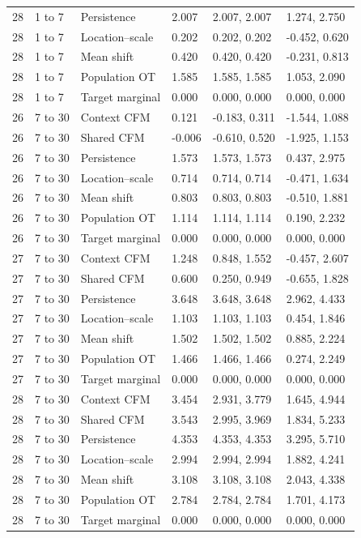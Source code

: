 \documentclass[10pt,a4paper]{article}
\begin{document}
{{\begin{longtable}{@{}p{14mm}p{18mm}p{36mm}p{24mm}p{32mm}p{39mm}@{}}
28 & 1 to 7 & Persistence & 2.007 & 2.007, 2.007 & 1.274, 2.750\\
28 & 1 to 7 & Location--scale & 0.202 & 0.202, 0.202 & -0.452, 0.620\\
28 & 1 to 7 & Mean shift & 0.420 & 0.420, 0.420 & -0.231, 0.813\\
28 & 1 to 7 & Population OT & 1.585 & 1.585, 1.585 & 1.053, 2.090\\
28 & 1 to 7 & Target marginal & 0.000 & 0.000, 0.000 & 0.000, 0.000\\
26 & 7 to 30 & Context CFM & 0.121 & -0.183, 0.311 & -1.544, 1.088\\
26 & 7 to 30 & Shared CFM & -0.006 & -0.610, 0.520 & -1.925, 1.153\\
26 & 7 to 30 & Persistence & 1.573 & 1.573, 1.573 & 0.437, 2.975\\
26 & 7 to 30 & Location--scale & 0.714 & 0.714, 0.714 & -0.471, 1.634\\
26 & 7 to 30 & Mean shift & 0.803 & 0.803, 0.803 & -0.510, 1.881\\
26 & 7 to 30 & Population OT & 1.114 & 1.114, 1.114 & 0.190, 2.232\\
26 & 7 to 30 & Target marginal & 0.000 & 0.000, 0.000 & 0.000, 0.000\\
27 & 7 to 30 & Context CFM & 1.248 & 0.848, 1.552 & -0.457, 2.607\\
27 & 7 to 30 & Shared CFM & 0.600 & 0.250, 0.949 & -0.655, 1.828\\
27 & 7 to 30 & Persistence & 3.648 & 3.648, 3.648 & 2.962, 4.433\\
27 & 7 to 30 & Location--scale & 1.103 & 1.103, 1.103 & 0.454, 1.846\\
27 & 7 to 30 & Mean shift & 1.502 & 1.502, 1.502 & 0.885, 2.224\\
27 & 7 to 30 & Population OT & 1.466 & 1.466, 1.466 & 0.274, 2.249\\
27 & 7 to 30 & Target marginal & 0.000 & 0.000, 0.000 & 0.000, 0.000\\
28 & 7 to 30 & Context CFM & 3.454 & 2.931, 3.779 & 1.645, 4.944\\
28 & 7 to 30 & Shared CFM & 3.543 & 2.995, 3.969 & 1.834, 5.233\\
28 & 7 to 30 & Persistence & 4.353 & 4.353, 4.353 & 3.295, 5.710\\
28 & 7 to 30 & Location--scale & 2.994 & 2.994, 2.994 & 1.882, 4.241\\
28 & 7 to 30 & Mean shift & 3.108 & 3.108, 3.108 & 2.043, 4.338\\
28 & 7 to 30 & Population OT & 2.784 & 2.784, 2.784 & 1.701, 4.173\\
28 & 7 to 30 & Target marginal & 0.000 & 0.000, 0.000 & 0.000, 0.000\\
\end{longtable}
}
}
\end{document}
